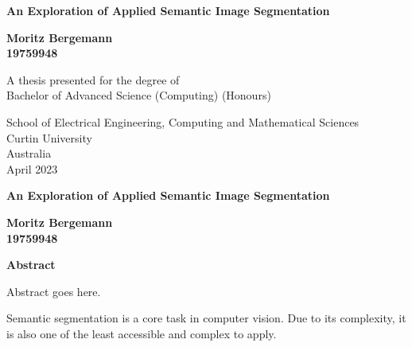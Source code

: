 \documentclass[a4paper,12pt]{report}
\begin{document}
{}
\begin{titlepage}
    \begin{center}
        \vspace*{0.5cm}

        \LARGE
        \textbf{An Exploration of Applied Semantic Image Segmentation}


        \vspace{1.0cm}
        \Large

        \textbf{Moritz Bergemann\\ 19759948}

        \vfill

        A thesis presented for the degree of\\
        Bachelor of Advanced Science (Computing) (Honours)

        \vspace{2.5cm}


        \large
        School of Electrical Engineering, Computing and Mathematical Sciences\\
        Curtin University\\
        Australia\\
        April 2023

    \end{center}
\end{titlepage}

\thispagestyle{plain}
\begin{center}
    \Large
    \textbf{An Exploration of Applied Semantic Image Segmentation}

    \vspace{0.4cm}
    \large

    \vspace{0.4cm}
    \textbf{Moritz Bergemann\\ 19759948}

    \vspace{0.9cm}
    \textbf{Abstract}
\end{center}

Abstract goes here.

Semantic segmentation is a core task in computer vision. Due to its complexity, it is also one of the least accessible and complex to apply.
\end{document}
